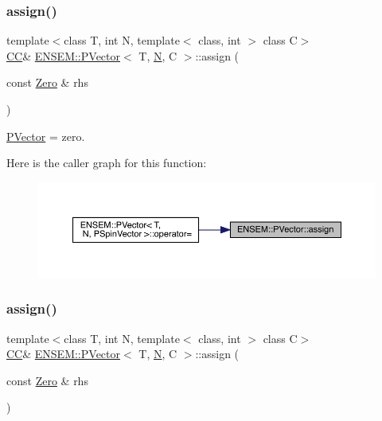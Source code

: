 \subsubsection{\texorpdfstring{assign()}{assign()}\hspace{0.1cm}{\footnotesize\ttfamily [1/4]}}
{\footnotesize\ttfamily template$<$class T, int N, template$<$ class, int $>$ class C$>$ \\
\mbox{\hyperlink{classENSEM_1_1PVector_a92dc0a0a301a3dc96f7be5d337019bc7}{CC}}\& \mbox{\hyperlink{classENSEM_1_1PVector}{E\+N\+S\+E\+M\+::\+P\+Vector}}$<$ T, \mbox{\hyperlink{operator__name__util_8cc_a7722c8ecbb62d99aee7ce68b1752f337}{N}}, C $>$\+::assign (\begin{DoxyParamCaption}\item[{const \mbox{\hyperlink{structENSEM_1_1Zero}{Zero}} \&}]{rhs }\end{DoxyParamCaption})\hspace{0.3cm}{\ttfamily [inline]}}



\mbox{\hyperlink{classENSEM_1_1PVector}{P\+Vector}} = zero. 

Here is the caller graph for this function\+:\nopagebreak
\begin{figure}[H]
\begin{center}
\leavevmode
\includegraphics[width=350pt]{da/d9c/classENSEM_1_1PVector_a2dec9eb5015ac1a8a261a20c08d9650c_icgraph}
\end{center}
\end{figure}
\mbox{\label{classENSEM_1_1PVector_a2dec9eb5015ac1a8a261a20c08d9650c}} 
\subsubsection{\texorpdfstring{assign()}{assign()}\hspace{0.1cm}{\footnotesize\ttfamily [2/4]}}
{\footnotesize\ttfamily template$<$class T, int N, template$<$ class, int $>$ class C$>$ \\
\mbox{\hyperlink{classENSEM_1_1PVector_a92dc0a0a301a3dc96f7be5d337019bc7}{CC}}\& \mbox{\hyperlink{classENSEM_1_1PVector}{E\+N\+S\+E\+M\+::\+P\+Vector}}$<$ T, \mbox{\hyperlink{operator__name__util_8cc_a7722c8ecbb62d99aee7ce68b1752f337}{N}}, C $>$\+::assign (\begin{DoxyParamCaption}\item[{const \mbox{\hyperlink{structENSEM_1_1Zero}{Zero}} \&}]{rhs }\end{DoxyParamCaption})\hspace{0.3cm}{\ttfamily [inline]}}



